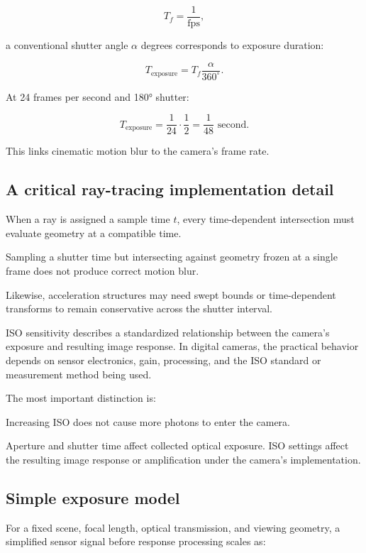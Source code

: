 \[ T_f=\frac1{\mathrm{fps}}, \]

a conventional shutter angle \(\alpha\) degrees corresponds to exposure duration:

\[ \boxed{ T_{\mathrm{exposure}} = T_f\frac{\alpha}{360^\circ}. } \]

At 24 frames per second and 180° shutter:

\[ T_{\mathrm{exposure}} = \frac1{24}\cdot\frac12 = \boxed{\frac1{48}\text{ second}}. \]

This links cinematic motion blur to the camera's frame rate.

\subsection{A critical ray-tracing implementation detail}\label{02-foundations-ii-ch036-a-critical-ray-tracing-implementation-detail}

When a ray is assigned a sample time \(t\), every time-dependent intersection must evaluate geometry at a compatible time.

Sampling a shutter time but intersecting against geometry frozen at a single frame does not produce correct motion blur.

Likewise, acceleration structures may need swept bounds or time-dependent transforms to remain conservative across the shutter interval.

ISO sensitivity describes a standardized relationship between the camera's exposure and resulting image response. In digital cameras, the practical behavior depends on sensor electronics, gain, processing, and the ISO standard or measurement method being used.

The most important distinction is:

Increasing ISO does not cause more photons to enter the camera.

Aperture and shutter time affect collected optical exposure. ISO settings affect the resulting image response or amplification under the camera's implementation.

\subsection{Simple exposure model}\label{02-foundations-ii-ch036-simple-exposure-model}

For a fixed scene, focal length, optical transmission, and viewing geometry, a simplified sensor signal before response processing scales as:

